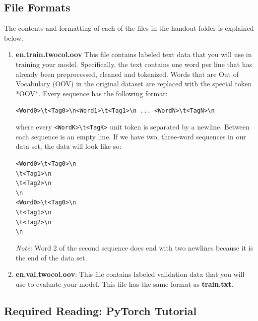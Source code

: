 \documentclass[11pt,addpoints,answers]{exam}
\begin{document}
\subsection{File Formats}\label{formats}
The contents and formatting of each of the files in the handout folder is explained below. 
\begin{enumerate}

\item \textbf{en.train.twocol.oov} This file contains labeled text data that you will use in training your model. Specifically, the text contains one word per line that has already been preprocessed, cleaned and tokenized. Words that are Out of Vocabulary (OOV) in the original dataset are replaced with the special token *OOV*. Every sequence has the following format:

    \texttt{<Word0>\textbackslash t<Tag0>\textbackslash n<Word1>\textbackslash t<Tag1>\textbackslash n ... <WordN>\textbackslash t<TagN>\textbackslash n}

where every \texttt{<WordK>\textbackslash t<TagK>} unit token is separated by a newline. Between each sequence is an empty line. If we have two, three-word sequences in our data set, the data will look like so:

    \texttt{<Word0>\textbackslash t<Tag0>\textbackslash n\\<Word1>\textbackslash t<Tag1>\textbackslash n\\<Word2>\textbackslash t<Tag2>\textbackslash n\\\textbackslash n\\}
    \texttt{<Word0>\textbackslash t<Tag0>\textbackslash n\\<Word1>\textbackslash t<Tag1>\textbackslash n\\<Word2>\textbackslash t<Tag2>\textbackslash n\\
    \textbackslash n}
    
\textit{Note:} Word 2 of the second sequence does end with two newlines because it is the end of the data set.

\item \textbf{en.val.twocol.oov}: This file contains labeled validation data that you will use to evaluate your model. This file has the same format as \textbf{train.txt}.
\end{enumerate}

\subsection{Required Reading: PyTorch Tutorial}
\end{document}
